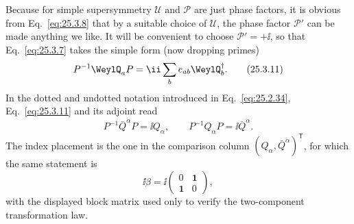 Because for simple supersymmetry \(\mathcal U\) and \(\mathcal P\) are just
phase factors, it is obvious from Eq.~\eqref{eq:25.3.8} that by a suitable
choice of \(\mathcal U\), the phase factor \(\mathcal P'\) can be made
anything we like. It will be convenient to choose \(\mathcal P'=+\ii\), so
that Eq.~\eqref{eq:25.3.7} takes the simple form (now dropping primes)
\begin{equation}
P^{-1}\WeylQ_aP
=\ii\sum_b e_{ab}\WeylQ_b^\dagger.
\tag{25.3.11}\label{eq:25.3.11}
\end{equation}
In the dotted and undotted notation introduced in
Eq.~\eqref{eq:25.2.34}, Eq.~\eqref{eq:25.3.11} and its adjoint read
\begin{equation}
P^{-1}\bar Q^{\dot\alpha}P=\ii Q_\alpha,
\qquad
P^{-1}Q_\alpha P=\ii\bar Q^{\dot\alpha}.
\tag{25.3.12}\label{eq:25.3.12}
\end{equation}
The index placement is the one in the comparison column
\((Q_\alpha,\bar Q^{\dot\alpha})^{\mathsf T}\), for which the same
statement is
\[
\ii\beta
=\ii\begin{pmatrix}
0&\mathbf{1}\\
\mathbf{1}&0
\end{pmatrix},
\]
with the displayed block matrix used only to verify the two-component
transformation law.

